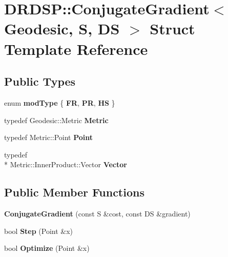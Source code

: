 \hypertarget{struct_d_r_d_s_p_1_1_conjugate_gradient}{\section{D\-R\-D\-S\-P\-:\-:Conjugate\-Gradient$<$ Geodesic, S, D\-S $>$ Struct Template Reference}
\label{struct_d_r_d_s_p_1_1_conjugate_gradient}
}
\subsection*{Public Types}
\begin{DoxyCompactItemize}
\item 
enum {\bfseries mod\-Type} \{ {\bfseries F\-R}, 
{\bfseries P\-R}, 
{\bfseries H\-S}
 \}
\item 
\hypertarget{struct_d_r_d_s_p_1_1_conjugate_gradient_ad2dbb9202d05ee3a642542bdb57f53d4}{typedef Geodesic\-::\-Metric {\bfseries Metric}}\label{struct_d_r_d_s_p_1_1_conjugate_gradient_ad2dbb9202d05ee3a642542bdb57f53d4}

\item 
\hypertarget{struct_d_r_d_s_p_1_1_conjugate_gradient_ae9a0676df2e8baf28e631cd3b0675f13}{typedef Metric\-::\-Point {\bfseries Point}}\label{struct_d_r_d_s_p_1_1_conjugate_gradient_ae9a0676df2e8baf28e631cd3b0675f13}

\item 
\hypertarget{struct_d_r_d_s_p_1_1_conjugate_gradient_ac17fb0d576c130d96dc7a0c679904195}{typedef \\*
Metric\-::\-Inner\-Product\-::\-Vector {\bfseries Vector}}\label{struct_d_r_d_s_p_1_1_conjugate_gradient_ac17fb0d576c130d96dc7a0c679904195}

\end{DoxyCompactItemize}
\subsection*{Public Member Functions}
\begin{DoxyCompactItemize}
\item 
\hypertarget{struct_d_r_d_s_p_1_1_conjugate_gradient_a6c456a95e7395dc7214f03009d71d551}{{\bfseries Conjugate\-Gradient} (const S \&cost, const D\-S \&gradient)}\label{struct_d_r_d_s_p_1_1_conjugate_gradient_a6c456a95e7395dc7214f03009d71d551}

\item 
\hypertarget{struct_d_r_d_s_p_1_1_conjugate_gradient_addebe2c816c58ead13698bb709be3c91}{bool {\bfseries Step} (Point \&x)}\label{struct_d_r_d_s_p_1_1_conjugate_gradient_addebe2c816c58ead13698bb709be3c91}

\item 
\hypertarget{struct_d_r_d_s_p_1_1_conjugate_gradient_af5a86a83da82cf11e590dc0a8c2b4899}{bool {\bfseries Optimize} (Point \&x)}\label{struct_d_r_d_s_p_1_1_conjugate_gradient_af5a86a83da82cf11e590dc0a8c2b4899}

\end{DoxyCompactItemize}
